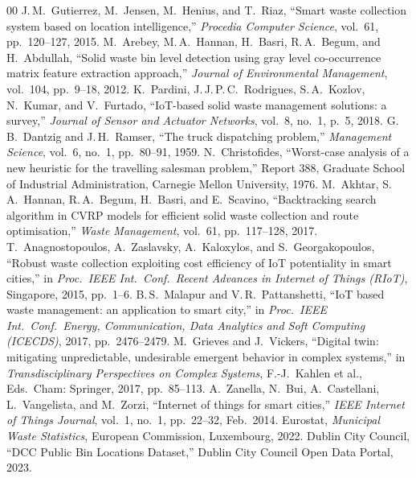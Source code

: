 \documentclass[conference, a4paper]{IEEEtran}
\begin{document}
\balance
\begin{thebibliography}{00}
 J.\,M.\ Gutierrez, M.\ Jensen, M.\ Henius, and T.\ Riaz, ``Smart waste collection system based on location intelligence,'' \textit{Procedia Computer Science}, vol.~61, pp.~120--127, 2015.
 M.\ Arebey, M.\,A.\ Hannan, H.\ Basri, R.\,A.\ Begum, and H.\ Abdullah, ``Solid waste bin level detection using gray level co-occurrence matrix feature extraction approach,'' \textit{Journal of Environmental Management}, vol.~104, pp.~9--18, 2012.
 K.\ Pardini, J.\,J.\,P.\,C.\ Rodrigues, S.\,A.\ Kozlov, N.\ Kumar, and V.\ Furtado, ``IoT-based solid waste management solutions: a survey,'' \textit{Journal of Sensor and Actuator Networks}, vol.~8, no.~1, p.~5, 2018.
 G.\,B.\ Dantzig and J.\,H.\ Ramser, ``The truck dispatching problem,'' \textit{Management Science}, vol.~6, no.~1, pp.~80--91, 1959.
 N.\ Christofides, ``Worst-case analysis of a new heuristic for the travelling salesman problem,'' Report 388, Graduate School of Industrial Administration, Carnegie Mellon University, 1976.
 M.\ Akhtar, S.\,A.\ Hannan, R.\,A.\ Begum, H.\ Basri, and E.\ Scavino, ``Backtracking search algorithm in CVRP models for efficient solid waste collection and route optimisation,'' \textit{Waste Management}, vol.~61, pp.~117--128, 2017.
 T.\ Anagnostopoulos, A.\ Zaslavsky, A.\ Kaloxylos, and S.\ Georgakopoulos, ``Robust waste collection exploiting cost efficiency of IoT potentiality in smart cities,'' in \textit{Proc.\ IEEE Int.\ Conf.\ Recent Advances in Internet of Things (RIoT)}, Singapore, 2015, pp.~1--6.
 B.\,S.\ Malapur and V.\,R.\ Pattanshetti, ``IoT based waste management: an application to smart city,'' in \textit{Proc.\ IEEE Int.\ Conf.\ Energy, Communication, Data Analytics and Soft Computing (ICECDS)}, 2017, pp.~2476--2479.
 M.\ Grieves and J.\ Vickers, ``Digital twin: mitigating unpredictable, undesirable emergent behavior in complex systems,'' in \textit{Transdisciplinary Perspectives on Complex Systems}, F.-J.\ Kahlen et al., Eds.\ Cham: Springer, 2017, pp.~85--113.
 A.\ Zanella, N.\ Bui, A.\ Castellani, L.\ Vangelista, and M.\ Zorzi, ``Internet of things for smart cities,'' \textit{IEEE Internet of Things Journal}, vol.~1, no.~1, pp.~22--32, Feb.~2014.
 Eurostat, \textit{Municipal Waste Statistics}, European Commission, Luxembourg, 2022.
 Dublin City Council, ``DCC Public Bin Locations Dataset,'' Dublin City Council Open Data Portal, 2023.
\end{thebibliography}
\end{document}
